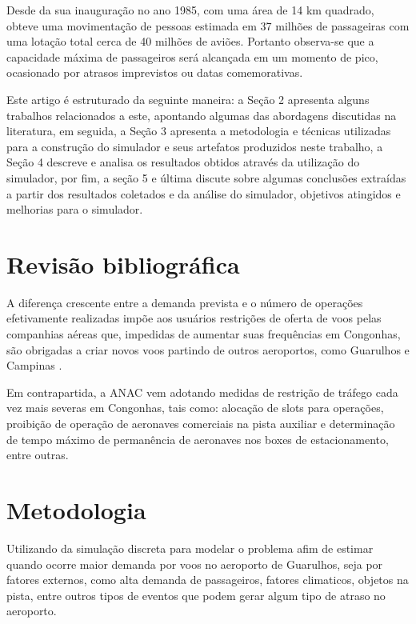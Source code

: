 \documentclass[12pt]{article}
\begin{document}
  Desde da sua inauguração no ano 1985, com uma área de 14 km quadrado,
  obteve uma movimentação de pessoas estimada em  37 milhões de passageiras
  com uma lotação total cerca de 40 milhões de aviões. Portanto observa-se
  que a capacidade máxima de passageiros será alcançada em um momento de
  pico, ocasionado por atrasos imprevistos ou datas comemorativas.
  




Este artigo é estruturado da seguinte maneira: a Seção 2 apresenta alguns trabalhos
relacionados a este, apontando algumas das abordagens discutidas na literatura,
em seguida, a Seção 3 apresenta a metodologia e técnicas utilizadas para a construção 
do simulador e seus artefatos produzidos neste trabalho, a Seção 4 descreve e analisa 
os resultados obtidos através da utilização do simulador, por fim, a seção 5 e última 
discute sobre algumas conclusões extraídas a partir dos resultados coletados e da 
análise do simulador, objetivos atingidos e melhorias para o simulador.
  

\section{Revisão bibliográfica} \label{sec:revisaobibliografica}

A diferença crescente entre a demanda prevista e o número de
operações efetivamente realizadas impõe aos usuários
restrições de oferta de voos pelas companhias aéreas que,
impedidas de aumentar suas frequências em Congonhas, são 
obrigadas a criar novos voos partindo de outros aeroportos,
como Guarulhos e Campinas \cite{boulic:91}.

Em contrapartida, a ANAC vem adotando medidas de restrição 
de tráfego cada vez mais severas em Congonhas, tais como: 
alocação de slots para operações, proibição de operação de 
aeronaves comerciais na pista auxiliar e determinação de tempo
máximo de permanência de aeronaves nos boxes de estacionamento,
entre outras. 


\section{Metodologia}

Utilizando da simulação discreta para modelar o problema afim de estimar
quando ocorre maior demanda por voos no aeroporto de Guarulhos, seja por
fatores externos, como alta demanda de passageiros, fatores climaticos,
objetos na pista, entre outros tipos de eventos que podem gerar algum 
tipo de atraso no aeroporto.
\end{document}
